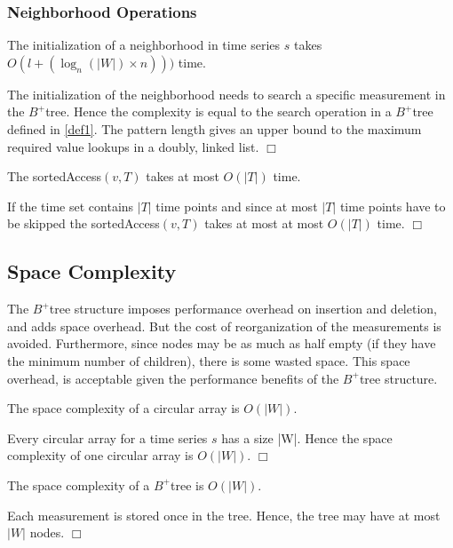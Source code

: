 \documentclass[abstracton,12pt,oneside]{scrreprt}
\newenvironment{proof}
  {\noindent{\bf Proof:\rm}}{\hfill$\Box$\vspace{\medskipamount}}
\begin{document}
\subsubsection{Neighborhood Operations}
\begin{mydef}
	The initialization of a neighborhood in time series $s$ takes $O(l+(\log_{n}(|W|) \times n)))$ time.
\end{mydef}
\begin{proof}
	The initialization of the neighborhood needs to search a specific measurement in the $B^+$tree. Hence the complexity is equal to the search operation in a $B^+$tree defined in \ref{def1}. The pattern length gives an upper bound to the maximum required value lookups in a doubly, linked list.
\end{proof}

\begin{mydef}
	The sortedAccess$(v,T)$ takes at most $O(|T|)$ time.
\end{mydef}
\begin{proof}
	If the time set contains $|T|$ time points and since at most $|T|$ time points have to be skipped the sortedAccess$(v,T)$ takes at most at most $O(|T|)$ time. 
\end{proof}

\subsection{Space Complexity}
The $B^+$tree structure imposes performance overhead on insertion
and deletion, and adds space overhead. But the cost of reorganization of the measurements is avoided. Furthermore,
since nodes may be as much as half empty (if they have the minimum
number of children), there is some wasted space. This space overhead, is
acceptable given the performance benefits of the $B^+$tree structure.
\begin{mydef}
	The space complexity of a circular array is $O(|W|)$.
\end{mydef}
\begin{proof}
	Every circular array for a time series $s$ has a size |W|. Hence the space complexity of one circular array is $O(|W|)$.
\end{proof}

\begin{mydef}
	The space complexity of a $B^+$tree is $O(|W|)$. 
\end{mydef}
\begin{proof}
	Each measurement is stored once in the tree. Hence, the tree may have at most $|W|$ nodes.  
\end{proof}
\end{document}
